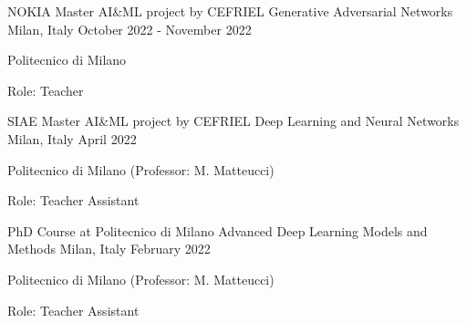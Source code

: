 \begin{cventries}
    \vspace{2mm}
    \cventry
        {NOKIA Master AI\&ML project by CEFRIEL}
        {Generative Adversarial Networks}
        {Milan, Italy}
        {October 2022 - November 2022}
        {
        \begin{cvitems}
            \item {Politecnico di Milano}
            \item {Role: Teacher}
        \end{cvitems}
        }

    \vspace{2mm}
    \cventry
        {SIAE Master AI\&ML project by CEFRIEL}
        {Deep Learning and Neural Networks}
        {Milan, Italy}
        {April 2022}
        {
        \begin{cvitems}
            \item {Politecnico di Milano (Professor: M. Matteucci)}
            \item {Role: Teacher Assistant}
        \end{cvitems}
        }

    \vspace{2mm}
    \cventry
        {PhD Course at Politecnico di Milano}
        {Advanced Deep Learning Models and Methods}
        {Milan, Italy}
        {February 2022}
        {
        \begin{cvitems}
            \item {Politecnico di Milano (Professor: M. Matteucci)}
            \item {Role: Teacher Assistant}
        \end{cvitems}
        }

\end{cventries}